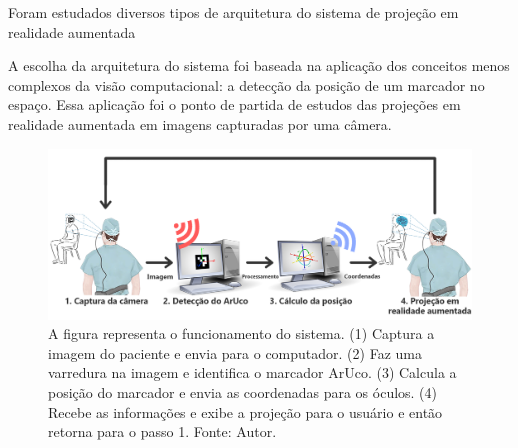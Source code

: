 
Foram estudados diversos tipos de arquitetura do sistema de projeção em realidade aumentada

A escolha da arquitetura do sistema foi baseada na aplicação dos conceitos menos complexos da visão computacional: a detecção da posição de um marcador no espaço. Essa aplicação foi o ponto de partida de estudos das projeções em realidade aumentada em imagens capturadas por uma câmera.

\begin{figure}[ht]
    \centering
    \includegraphics[width=.9\linewidth]{figuras/System schematic.png}
    \caption{A figura representa o funcionamento do sistema. (1) Captura a imagem do paciente e envia para o computador. (2) Faz uma varredura na imagem e identifica o marcador ArUco. (3) Calcula a posição do marcador e envia as coordenadas para os óculos. (4) Recebe as informações e exibe a projeção para o usuário e então retorna para o passo 1. Fonte: Autor.}
    \label{fig:arc}
\end{figure}







